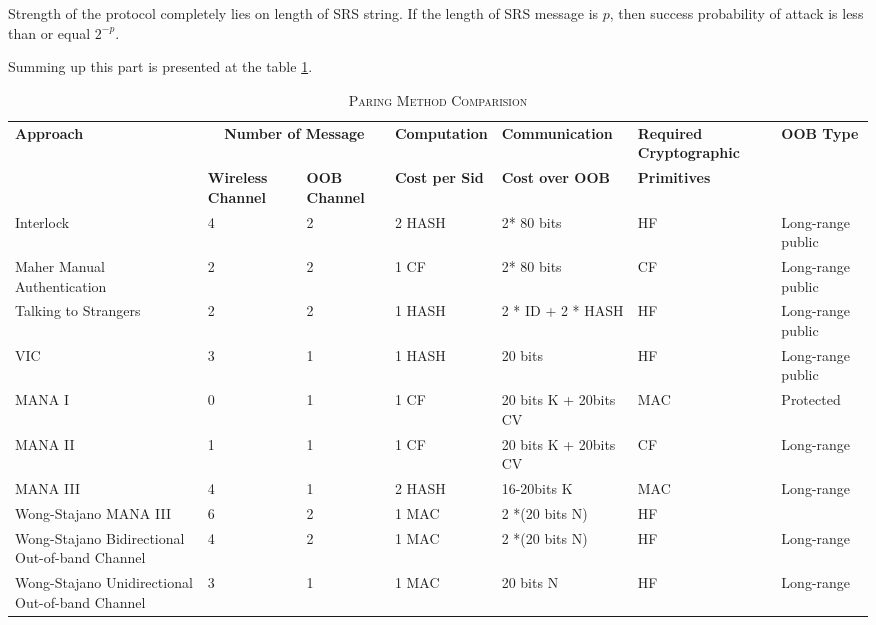 Strength of the protocol completely lies on length of SRS string. If the length of SRS message is $p$, then success probability of attack is less than or equal $2^{-p}$. 

Summing up this part is presented at the table \ref{paircom}.

\begin{table}[ht] 
\centering
\caption{\textsc{Paring Method Comparision}}
\label{paircom}
{\scriptsize
\begin{tabular}{ | p{2cm} | p{1.4cm} | p{1.4cm} | p{2cm} | p{2.2cm} | p{2cm} | p{2cm}| }
\hline
\textbf{Approach} &\multicolumn{2}{c}{ \textbf{Number of Message}} & \textbf{Computation} & \textbf{Communication} & \textbf{Required Cryptographic} & \textbf{OOB Type}\\ 
 & \textbf{Wireless Channel} & \textbf{OOB Channel} & \textbf{Cost per Sid} & \textbf{Cost over OOB} & \textbf{Primitives} & \\ \hline \hline

Interlock & 4 & 2 & 2 HASH & 2* 80 bits & HF & Long-range public \\ \hline

Maher Manual Authentication & 2 & 2 & 1 CF & 2* 80 bits & CF & Long-range public \\ \hline

Talking to Strangers & 2 &	 2	& 1  HASH &	 2 * ID + 2 * HASH	& HF	&  Long-range public \\ \hline 

VIC & 3	& 1	& 1 HASH 	 & 20 bits & HF & Long-range public \\ \hline 

MANA I	& 0	& 1	& 1 CF & 20 bits K + 20bits CV  & MAC & Protected\\ \hline 

MANA II	& 1	& 1 & 1 CF & 20 bits K + 20bits CV	& CF & Long-range \\ \hline 

MANA III	& 4	& 1 & 2  HASH	& 16-20bits K & MAC & Long-range\\ \hline 

Wong-Stajano MANA III & 6 & 2	& 1 MAC	& 2 *(20 bits N) & HF & \\ \hline 

Wong-Stajano Bidirectional Out-of-band Channel & 4	 & 2	& 1 MAC & 2 *(20 bits N) 	 & HF	 & Long-range\\ \hline 

Wong-Stajano Unidirectional Out-of-band Channel & 3 &	 1	& 1 MAC	 & 20 bits N &	 HF & Long-range \\ \hline 


\end{tabular}}
\end{table}
